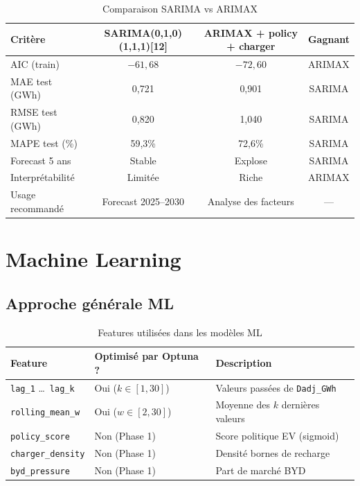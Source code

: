 \documentclass[12pt,a4paper]{article}
\begin{document}
\begin{table}[H]
\centering
\caption{Comparaison SARIMA vs ARIMAX}
\begin{tabular}{lccc}
\toprule
\textbf{Critère} & \textbf{SARIMA(0,1,0)(1,1,1)[12]}
  & \textbf{ARIMAX + policy + charger} & \textbf{Gagnant} \\
\midrule
AIC (train)        & $-61{,}68$ & $-72{,}60$ & \textcolor{successgreen}{ARIMAX} \\
MAE test (GWh)     & 0,721  & 0,901  & \textcolor{primaryblue}{SARIMA} \\
RMSE test (GWh)    & 0,820  & 1,040  & \textcolor{primaryblue}{SARIMA} \\
MAPE test (\%)     & 59,3\% & 72,6\% & \textcolor{primaryblue}{SARIMA} \\
Forecast 5 ans     & Stable & Explose & \textcolor{primaryblue}{SARIMA} \\
Interprétabilité   & Limitée & Riche  & \textcolor{successgreen}{ARIMAX} \\
Usage recommandé   & Forecast 2025--2030 & Analyse des facteurs & --- \\
\bottomrule
\end{tabular}
\end{table}

\section{Machine Learning}

\subsection{Approche générale ML}

\begin{table}[H]
\centering
\caption{Features utilisées dans les modèles ML}
\begin{tabular}{lll}
\toprule
\textbf{Feature} & \textbf{Optimisé par Optuna ?} & \textbf{Description} \\
\midrule
\texttt{lag\_1} \ldots\ \texttt{lag\_k}
  & Oui ($k \in [1, 30]$) & Valeurs passées de \texttt{Dadj\_GWh} \\
\texttt{rolling\_mean\_w}
  & Oui ($w \in [2, 30]$) & Moyenne des $k$ dernières valeurs \\
\texttt{policy\_score}  & Non (Phase 1) & Score politique EV (sigmoid) \\
\texttt{charger\_density} & Non (Phase 1) & Densité bornes de recharge \\
\texttt{byd\_pressure}  & Non (Phase 1) & Part de marché BYD \\
\bottomrule
\end{tabular}
\end{table}
\end{document}
